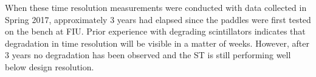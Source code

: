 When these time resolution measurements were conducted with data collected in Spring 2017, approximately 3 years had elapsed since the paddles were first tested on the bench at FIU.  Prior experience with degrading scintillators indicates that degradation in time resolution will be visible in a matter of weeks.  However, after 3 years no degradation has been observed and the ST is still performing well below design resolution.

%